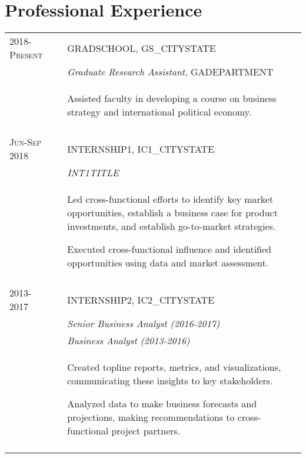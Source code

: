 \documentclass[a4paper,10pt]{article}
\begin{document}
\section{Professional Experience}
\begin{supertabular}{l p{0.55cm} p{13.9cm}}
	\textsc{2018-Present}				&& \textsc{GRADSCHOOL}, GS_CITYSTATE \\
	\small\textsc{}							&& \small	\emph{Graduate Research Assistant}, \small GADEPARTMENT \\
															&& \begin{enumerate*}[label =$\diamond$,itemjoin={\newline}]
																	\item \footnotesize Assisted faculty in developing a course on business strategy and international political economy.
																	\end{enumerate*} \vspace{2mm} \\

	 \\

	\textsc{Jun-Sep 2018}	&& \textsc{INTERNSHIP1}, IC1_CITYSTATE \\
												&& \small	\emph{INT1TITLE} \\
												&& \begin{enumerate*}[label =$\diamond$, itemjoin={\newline}]
														\item \footnotesize Led cross-functional efforts to identify key market opportunities, establish a business case for product investments, and establish go-to-market strategies. 
														\item \footnotesize Executed cross-functional influence and identified opportunities using data and market assessment.
													\end{enumerate*} \\
	 \\
	



	\textsc{2013-2017}		&& \textsc{INTERNSHIP2}, IC2_CITYSTATE \\
												&& \small	\emph{Senior Business Analyst (2016-2017)} \\
												&& \small	\emph{Business Analyst (2013-2016)} \\
												&& \begin{enumerate*}[label =$\diamond$, itemjoin={\newline}]
														\item \footnotesize Created topline reports, metrics, and visualizations, communicating these insights to key stakeholders.
														\item \footnotesize Analyzed data to make business forecasts and projections, making recommendations to cross-functional project partners. \end{enumerate*} \\
	 \\
	



\end{supertabular}
\end{document}
